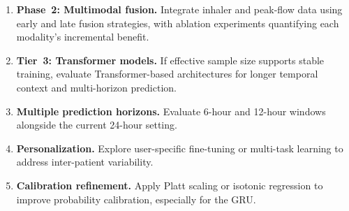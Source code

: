\documentclass[11pt,a4paper]{article}
\begin{document}
\begin{enumerate}[nosep]
  \item \textbf{Phase~2: Multimodal fusion.}  Integrate inhaler and peak-flow
        data using early and late fusion strategies, with ablation experiments
        quantifying each modality's incremental benefit.
  \item \textbf{Tier~3: Transformer models.}  If effective sample size
        supports stable training, evaluate Transformer-based architectures for
        longer temporal context and multi-horizon prediction.
  \item \textbf{Multiple prediction horizons.}  Evaluate 6-hour and 12-hour
        windows alongside the current 24-hour setting.
  \item \textbf{Personalization.}  Explore user-specific fine-tuning or
        multi-task learning to address inter-patient variability.
  \item \textbf{Calibration refinement.}  Apply Platt scaling or isotonic
        regression to improve probability calibration, especially for the GRU.
\end{enumerate}


\end{document}
